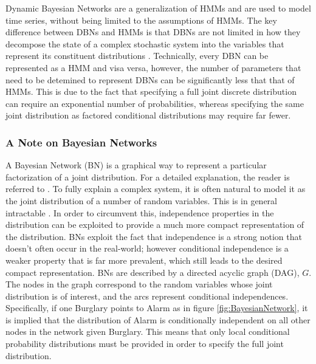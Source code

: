 
Dynamic Bayesian Networks are a generalization of HMMs and are used to model time series, without being limited to the assumptions of HMMs. The key difference between DBNs and HMMs is that DBNs are not limited in how they decompose the state of a complex stochastic system into the variables that represent its constituent distributions \cite{AIAMA}. Technically, every DBN can be represented as a HMM and visa versa, however, the number of parameters that need to be detemined to represent DBNs can be significantly less that that of HMMs. This is due to the fact that specifying a full joint discrete distribution can require an exponential number of probabilities, whereas specifying the same joint distribution as factored conditional distributions may require far fewer.

\subsubsection{A Note on Bayesian Networks}
A Bayesian Network (BN) is a graphical way to represent a particular factorization of a joint distribution. For a detailed explanation, the reader is referred to \cite{KollerPGM}. To fully explain a complex system, it is often natural to model it as the joint distribution of a number of random variables. This is in general intractable \cite{KollerPGM}. In order to circumvent this, independence properties in the distribution can be exploited to provide a much more compact representation of the distribution. BNs exploit the fact that independence is a strong notion that doesn't often occur in the real-world; however conditional independence is a weaker property that is far more prevalent, which still leads to the desired compact representation. BNs are described by a directed acyclic graph (DAG), $G$. The nodes in the graph correspond to the random variables whose joint distribution is of interest, and the arcs represent conditional independences. Specifically, if one Burglary points to Alarm as in figure \ref{fig:BayesianNetwork}, it is implied that the distribution of Alarm is conditionally independent on all other nodes in the network given Burglary. This means that only local conditional probability distributions must be provided in order to specify the full joint distribution.

